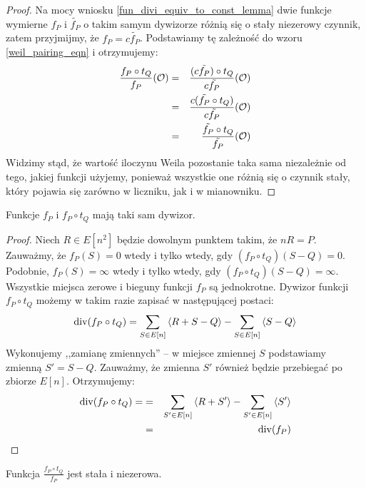 \begin{proof}
Na mocy wniosku \ref{fun_divi_equiv_to_const_lemma}
dwie funkcje wymierne $f_P$ i $\tilde{f_P}$ o takim samym dywizorze
różnią się o stały niezerowy czynnik,
zatem przyjmijmy, że $f_P = c\tilde{f_P}$.
Podstawiamy tę zależność do wzoru \ref{weil_pairing_eqn} i otrzymujemy:
\begin{eqnarray*}
\frac{f_P \circ t_Q}{f_P}(\mathcal{O})
& = & \frac{(c\tilde{f_P}) \circ t_Q}{c\tilde{f_P}}(\mathcal{O}) \\
& = & \frac{c(\tilde{f_P} \circ t_Q)}{c\tilde{f_P}}(\mathcal{O}) \\
& = & \frac{\tilde{f_P} \circ t_Q}{\tilde{f_P}}(\mathcal{O})
\end{eqnarray*}
Widzimy stąd, że wartość iloczynu Weila pozostanie taka sama
niezależnie od tego, jakiej funkcji użyjemy,
ponieważ wszystkie one różnią się o czynnik stały,
który pojawia się zarówno w liczniku, jak i w mianowniku.
\end{proof}

\begin{lemma}\label{weil_pairing_same_divi_lemma}
Funkcje $f_P$ i $f_P \circ t_Q$ mają taki sam dywizor.
\end{lemma}

\begin{proof}
Niech $R \in E[n^2]$ będzie dowolnym punktem takim, że $nR = P$.
Zauważmy, że $f_P(S) = 0$ wtedy i tylko wtedy,
gdy $(f_P \circ t_Q)(S - Q) = 0$.
Podobnie, $f_P(S) = \infty$ wtedy i tylko wtedy,
gdy $(f_P \circ t_Q)(S - Q) = \infty$.
Wszystkie miejsca zerowe i bieguny funkcji $f_P$ są jednokrotne.
Dywizor funkcji $f_P \circ t_Q$ możemy w takim razie zapisać
w następującej postaci:
\begin{equation*}
\operatorname{div}(f_P \circ t_Q) =
\sum_{S \in E[n]} \left\langle R + S - Q\right\rangle - \sum_{S \in E[n]} \left\langle S - Q\right\rangle
\end{equation*}
Wykonujemy ,,zamianę zmiennych'' --
w miejsce zmiennej $S$ podstawiamy zmienną $S' = S - Q$.
Zauważmy, że zmienna $S'$ również będzie przebiegać po zbiorze $E[n]$.
Otrzymujemy:
\begin{eqnarray*}
\operatorname{div}(f_P \circ t_Q) =
& = & \sum_{S' \in E[n]} \left\langle R + S'\right\rangle - \sum_{S' \in E[n]} \left\langle S'\right\rangle \\
& = & \operatorname{div}(f_P)
\end{eqnarray*}
\end{proof}

\begin{corollary}\label{weil_pairing_fun_const_coro}
Funkcja $\frac{f_P \circ t_Q}{f_P}$ jest stała i niezerowa.
\end{corollary}

